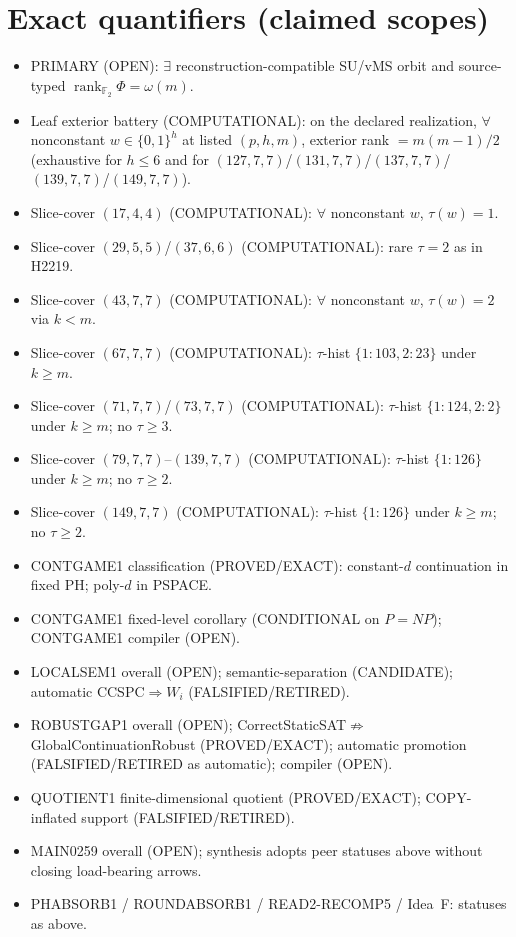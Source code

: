 \documentclass[11pt]{article}
\begin{document}
\section*{Exact quantifiers (claimed scopes)}
\begin{itemize}
\item PRIMARY (OPEN): $\exists$ reconstruction-compatible SU/vMS orbit and source-typed
  $\operatorname{rank}_{\mathbb F_2}\Phi=\omega(m)$.
\item Leaf exterior battery (COMPUTATIONAL): on the declared realization, $\forall$ nonconstant
  $w\in\{0,1\}^h$ at listed $(p,h,m)$, exterior rank $=m(m-1)/2$
  (exhaustive for $h\le6$ and for $(127,7,7)$/$(131,7,7)$/$(137,7,7)$/$(139,7,7)$/$(149,7,7)$).
\item Slice-cover $(17,4,4)$ (COMPUTATIONAL): $\forall$ nonconstant $w$, $\tau(w)=1$.
\item Slice-cover $(29,5,5)$/$(37,6,6)$ (COMPUTATIONAL): rare $\tau{=}2$ as in H2219.
\item Slice-cover $(43,7,7)$ (COMPUTATIONAL): $\forall$ nonconstant $w$, $\tau(w)=2$ via $k{<}m$.
\item Slice-cover $(67,7,7)$ (COMPUTATIONAL): $\tau$-hist $\{1{:}103,2{:}23\}$ under $k{\ge}m$.
\item Slice-cover $(71,7,7)$/$(73,7,7)$ (COMPUTATIONAL): $\tau$-hist $\{1{:}124,2{:}2\}$ under $k{\ge}m$;
  no $\tau{\ge}3$.
\item Slice-cover $(79,7,7)$--$(139,7,7)$ (COMPUTATIONAL): $\tau$-hist $\{1{:}126\}$ under $k{\ge}m$;
  no $\tau{\ge}2$.
\item Slice-cover $(149,7,7)$ (COMPUTATIONAL): $\tau$-hist $\{1{:}126\}$ under $k{\ge}m$;
  no $\tau{\ge}2$.
\item CONTGAME1 classification (PROVED/EXACT): constant-$d$ continuation in fixed PH;
  poly-$d$ in PSPACE.
\item CONTGAME1 fixed-level corollary (CONDITIONAL on $P=NP$); CONTGAME1 compiler (OPEN).
\item LOCALSEM1 overall (OPEN); semantic-separation (CANDIDATE); automatic CCSPC$\Rightarrow W_i$ (FALSIFIED/RETIRED).
\item ROBUSTGAP1 overall (OPEN); CorrectStaticSAT$\not\Rightarrow$GlobalContinuationRobust (PROVED/EXACT);
  automatic promotion (FALSIFIED/RETIRED as automatic); compiler (OPEN).
\item QUOTIENT1 finite-dimensional quotient (PROVED/EXACT); COPY-inflated support (FALSIFIED/RETIRED).
\item MAIN0259 overall (OPEN); synthesis adopts peer statuses above without closing load-bearing arrows.
\item PHABSORB1 / ROUNDABSORB1 / READ2-RECOMP5 / Idea~F: statuses as above.
\end{itemize}
\end{document}
